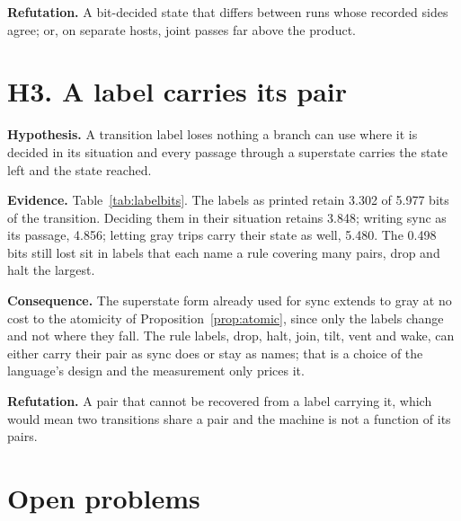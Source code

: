 \textbf{Refutation.} A bit-decided state that differs between runs whose recorded sides agree;
or, on separate hosts, joint passes far above the product.

\section{H3. A label carries its pair}
\label{sec:h3}

\textbf{Hypothesis.} A transition label loses nothing a branch can use where it is decided in its
situation and every passage through a superstate carries the state left and the state reached.

\textbf{Evidence.} Table~\ref{tab:labelbits}. The labels as printed retain 3.302 of 5.977 bits of
the transition. Deciding them in their situation retains 3.848; writing sync as its passage, 4.856;
letting gray trips carry their state as well, 5.480. The 0.498 bits still lost sit in labels
that each name a rule covering many pairs, drop and halt the largest.

\textbf{Consequence.} The superstate form already used for sync extends to gray at no cost to the
atomicity of Proposition~\ref{prop:atomic}, since only the labels change and not where they fall.
The rule labels, drop, halt, join, tilt, vent and wake, can either carry their pair as sync does or
stay as names; that is a choice of the language's design and the measurement only prices it.

\textbf{Refutation.} A pair that cannot be recovered from a label carrying it, which would mean
two transitions share a pair and the machine is not a function of its pairs.

\section{Open problems}

